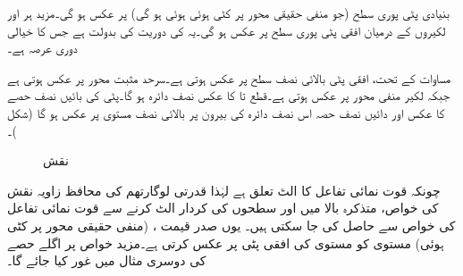 بنیادی پٹی  پوری  سطح  (جو منفی حقیقی محور پر کٹی ہوئی ہوئی ہو گی) پر عکس ہو گی۔مزید ہر  اور  لکیروں کے درمیان افقی پٹی  پوری  سطح پر عکس ہو گی۔یہ  کی دوریت کی بدولت ہے جس کا خیالی دوری عرصہ  ہے۔

مساوات  کے تحت، افقی پٹی  بالائی نصف  سطح پر عکس ہوتی ہے۔سرحد  مثبت   محور پر عکس ہوتی ہے جبکہ لکیر  منفی  محور پر عکس ہوتی ہے۔قطع  تا  کا عکس نصف دائرہ  ہو گا۔پٹی کی بائیں نصف  حصے کا عکس  اور دائیں نصف  حصہ  اس نصف دائرہ   کی بیرون پر بالائی نصف  مستوی پر عکس ہو گا (شکل )۔
\begin{figure}
\centering
\begin{subfigure}{0.5\textwidth}
\centering
{}
\end{subfigure}%
\begin{subfigure}{0.5\textwidth}
\centering
{}
\end{subfigure}%
\caption{نقش }
\label{شکل_نقش_قوت-نمائی_ب}
\end{figure}

چونکہ قوت نمائی تفاعل کا الٹ  تعلق    ہے لہٰذا قدرتی لوگارتھم کی محافظ زاویہ نقش کی خواص، متذکرہ بالا میں  اور  سطحوں کی کردار  الٹ کرنے سے  قوت نمائی تفاعل کی خواص سے حاصل کی جا سکتی ہیں۔ یوں صدر قیمت ، (منفی حقیقی محور پر کٹی ہوئی)   مستوی کو  مستوی کی افقی پٹی  پر عکس کرتی ہے۔مزید خواص پر اگلے حصے کی دوسری مثال میں غور کیا جائے گا۔

